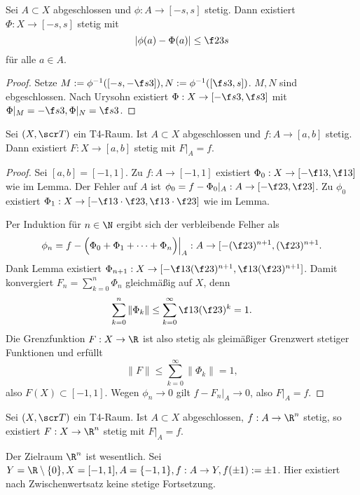 \begin{lem}
	Sei $A \subset X$ abgeschlossen und $\phi: A \to [-s, s]$ stetig.
	Dann existiert $\Phi: X \to [-s, s]$ stetig mit
	\[
		|\phi(a) - \Phi(a)| \le \f 23 s
	\]
	für alle $a \in A$.
	\begin{proof}
		Setze $M := \phi^{-1}([-s, - \f s3]), N := \phi^{-1}([\f s3, s])$.
		$M, N$ sind ebgeschlossen.
		Nach Urysohn existiert $\Phi: X \to [-\f s3, \f s3]$ mit $\Phi|_M = - \f s3, \Phi|_N = \f s3$.
	\end{proof}
\end{lem}

\begin{st}[Tietze]
	Sei $(X, \scr T)$ ein T4-Raum.
	Ist $A \subset X$ abgeschlossen und $f: A \to [a,b]$ stetig.
	Dann existiert $F: X \to [a,b]$ stetig mit $F|_A = f$.
	\begin{proof}
		Sei \oBdA $[a,b] = [-1,1]$.
		Zu $f: A \to [-1,1]$ existiert $\Phi_0 : X \to [-\f 13, \f 13]$ wie im Lemma.
		Der Fehler auf $A$ ist $\phi_0 = f - \Phi_0|_A : A \to [-\f 23, \f 23]$.
		Zu $\phi_0$ existiert $\Phi_1: X \to [-\f 13 \cdot \f 23, \f 13 \cdot \f 23]$ wie im Lemma. %

		Per Induktion für $n \in \N$ ergibt sich der verbleibende Felher als
		\[
			\phi_n = f - \Big( \Phi_0 + \Phi_1 + \dotsb + \Phi_n \Big)\Big|_A
			: A \to [-(\f 23)^{n+1}, (\f 23)^{n+1}.
		\]
		Dank Lemma existiert $\Phi_{n+1}: X \to [-\f 13(\f 23)^{n+1}, \f 13 (\f 23)^{n+1}]$.
		Damit konvergiert $F_n = \sum_{k=0}^n \Phi_n$ gleichmäßig auf $X$, denn
		\[
			\sum_{k=0}^n \|\Phi_k\|
			\le \sum_{k=0}^\infty \f 13 (\f 23)^k
			= 1.
		\]
		Die Grenzfunktion $F: X \to \R$ ist also stetig als gleimäßiger Grenzwert stetiger Funktionen und erfüllt
		\[
			\|F\| \le \sum_{k=0}^\infty \|\Phi_k\| = 1,
		\]
		also $F(X) \subset [-1, 1]$.
		Wegen $\phi_n \to 0$ gilt $f - F_n|_A \to 0$, also $F|_A = f$.
	\end{proof}
\end{st}

\begin{kor}
	Sei $(X, \scr T)$ ein T4-Raum.
	Ist $A \subset X$ abgeschlossen, $f: A \to \R^n$ stetig, so existiert $F: X \to \R^n$ stetig mit $F|_A = f$.
	\begin{note}
		Der Zielraum $\R^n$ ist wesentlich.
		Sei $Y = \R \setminus \{0\}, X = [-1,1], A = \{-1, 1\}, f: A \to Y, f(\pm 1) := \pm 1$.
		Hier existiert nach Zwischenwertsatz keine stetige Fortsetzung.
	\end{note}
\end{kor}

